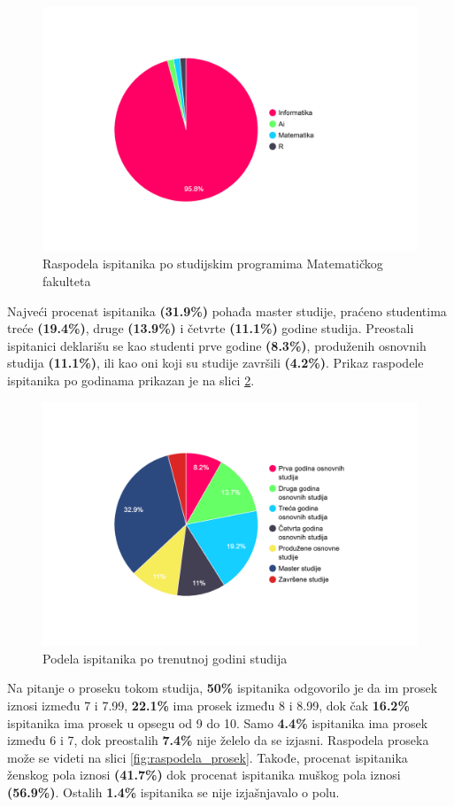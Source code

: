 \documentclass[a4paper]{article}
\begin{document}
{\begin{figure}[H]
    \centering
    \includegraphics[width=0.7\linewidth]{Slike/PieChartSmerovi.png}
    \caption{Raspodela ispitanika po studijskim programima Matematičkog fakulteta}
    \label{fig:raspodela_smerovi}
\end{figure}


Najveći procenat ispitanika \textbf{(31.9\%)} pohađa master studije, praćeno studentima treće \textbf{(19.4\%)}, druge \textbf{(13.9\%)} i četvrte \textbf{(11.1\%)} godine studija. Preostali ispitanici deklarišu se kao studenti prve godine \textbf{(8.3\%)}, produženih osnovnih studija \textbf{(11.1\%)}, ili kao oni koji su studije završili \textbf{(4.2\%)}. Prikaz raspodele ispitanika po godinama prikazan je na slici \ref{fig:raspodela_godine}.

\begin{figure}[H]
    \centering
    \includegraphics[width=0.7\linewidth]{Slike/PieChartGodinaStudiranja.png}
    \caption{Podela ispitanika po trenutnoj godini studija}
    \label{fig:raspodela_godine}
\end{figure}


Na pitanje o proseku tokom studija, \textbf{50\%} ispitanika odgovorilo je da im prosek iznosi između 7 i 7.99, \textbf{22.1\%} ima prosek između 8 i 8.99, dok čak \textbf{16.2\%} ispitanika ima prosek u opsegu od 9 do 10. Samo \textbf{4.4\%} ispitanika ima prosek između 6 i 7, dok preostalih \textbf{7.4\%} nije želelo da se izjasni. Raspodela proseka može se videti na slici \ref{fig:raspodela_prosek}. Takođe, procenat ispitanika ženskog pola iznosi \textbf{(41.7\%)} dok procenat ispitanika muškog pola iznosi \textbf{(56.9\%)}. Ostalih \textbf{1.4\%} ispitanika se nije izjašnjavalo o polu.

}
\end{document}

